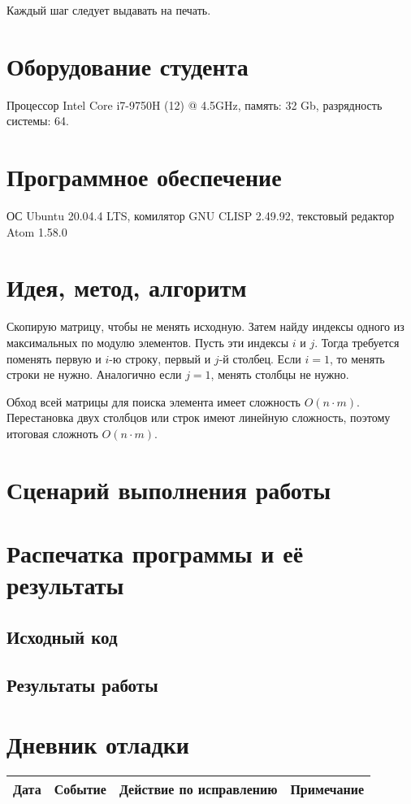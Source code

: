 \documentclass[12pt]{article}
\begin{document}
Каждый шаг следует выдавать на печать.

\section{Оборудование студента}
Процессор Intel Core i7-9750H (12) @ 4.5GHz, память: 32 Gb, разрядность системы: 64.

\section{Программное обеспечение}
ОС Ubuntu 20.04.4 LTS, комилятор GNU CLISP 2.49.92, текстовый редактор Atom 1.58.0

\pagebreak
\section{Идея, метод, алгоритм}
Скопирую матрицу, чтобы не менять исходную. Затем найду индексы одного из максимальных по модулю элементов. Пусть эти индексы $i$ и $j$. Тогда требуется поменять первую и $i$-ю строку, первый и $j$-й столбец. Если $i = 1$, то менять строки не нужно. Аналогично если $j = 1$, менять столбцы не нужно.

Обход всей матрицы для поиска элемента имеет сложность $O(n \cdot m)$. Перестановка двух столбцов или строк имеют линейную сложность, поэтому итоговая сложноть $O(n \cdot m)$.

\section{Сценарий выполнения работы}

\section{Распечатка программы и её результаты}

\subsection{Исходный код}


\pagebreak
\subsection{Результаты работы}


\pagebreak
\section{Дневник отладки}
\begin{tabular}{|p{50pt}|p{80pt}|p{140pt}|p{140pt}|}
\hline
Дата & Событие & Действие по исправлению & Примечание \\
\hline
\end{tabular}
\end{document}
